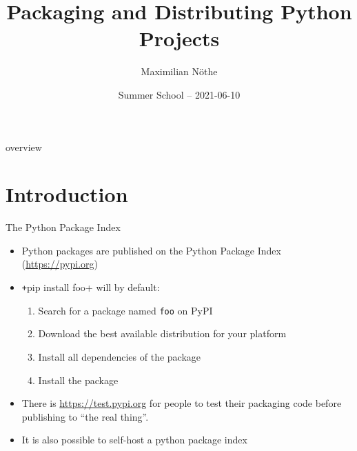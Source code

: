 
\author[M. Nöthe]{Maximilian Nöthe}
\title[Packaging]{Packaging and Distributing Python Projects}
\date[2021-06-10]{%
  \Large Summer School – 2021-06-10
}



\maketitle

\begin{frame}[c]{overview}
  \tableofcontents
\end{frame}

\copywarning{}

\section{Introduction}

\begin{frame}[c]{The Python Package Index}
  \begin{itemize}
    \item Python packages are published on the Python Package Index (\url{https://pypi.org})
    \item \texttt+pip install foo+ will by default:
      \begin{enumerate}
        \item Search for a package named \texttt{foo} on PyPI
        \item Download the best available distribution for your platform
        \item Install all dependencies of the package
        \item Install the package
      \end{enumerate}
    \item There is \url{https://test.pypi.org} for people to test their packaging code before
      publishing to \enquote{the real thing}.
    \item It is also possible to self-host a python package index
  \end{itemize}
\end{frame}

